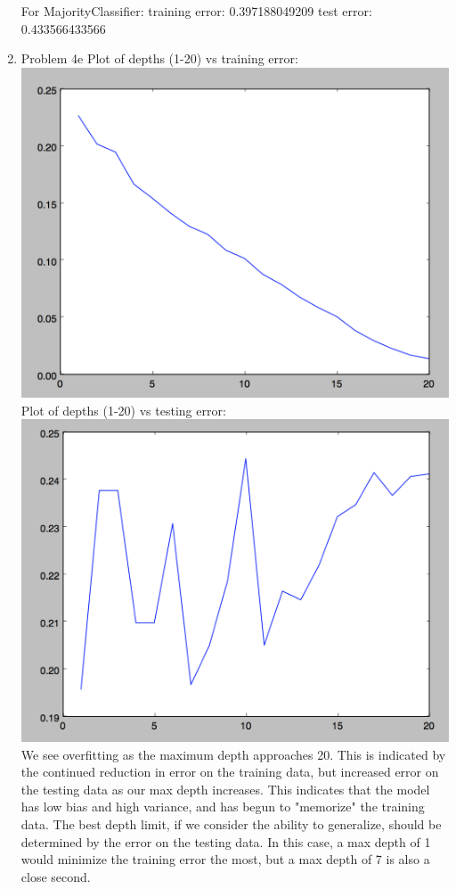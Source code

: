 \documentclass[11pt]{article}
\newcommand{\solution}[1]{{{\color{blue}{\bf Solution:} {#1}}}}
\begin{document}
\begin{enumerate}
{\newline{}
For MajorityClassifier: 
training error: 0.397188049209 \newline{}
test error: 0.433566433566
}
\item Problem 4e
\solution{
Plot of depths (1-20) vs training error: 
\newline{}
\includegraphics[scale=0.5]{training_error.png}
\newline{}
Plot of depths (1-20) vs testing error: 
\newline{}
\includegraphics[scale=0.5]{testing_error.png}
\newline{}
We see overfitting as the maximum depth approaches 20. This is indicated by the continued reduction in error on the training data, but increased error on the testing data as our max depth increases. This indicates that the model has low bias and high variance, and has begun to "memorize" the training data. The best depth limit, if we consider the ability to generalize, should be determined by the error on the testing data. In this case, a max depth of 1 would minimize the training error the most, but a max depth of 7 is also a close second. 
}
\end{enumerate}
\end{document}
